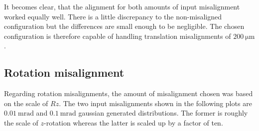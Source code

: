 It becomes clear, that the alignment for both amounts of input misalignment worked equally well. There is a little discrepancy to the non-misaligned configuration but the differences are small enough to be negligible.
The chosen configuration is therefore capable of handling translation misalignments of $\SI{200}{\micro\metre}$.

\subsection{Rotation misalignment}
\label{sec:misR}

Regarding rotation misalignments, the amount of misalignment chosen was based on the scale of $Rz$.
The two input misalignments shown in the following plots are $\SI{0.01}{\milli\radian}$ and $\SI{0.1}{\milli\radian}$ gaussian generated distributions. The former is roughly the scale of $z$-rotation whereas the latter is scaled up by a factor of ten.


